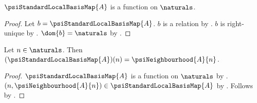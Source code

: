 \begin{proposition}\label{psi_standard_local_basis_map_type}
    $\psiStandardLocalBasisMap{A}$ is a function on $\naturals$.
\end{proposition}
\begin{proof}
    Let $b=\psiStandardLocalBasisMap{A}$.
    $b$ is a relation by
        .
    $b$ is right-unique by
        .
    $\dom{b}=\naturals$ by
        .
\end{proof}

\begin{proposition}\label{psi_standard_local_basis_map_application}
    Let $n\in\naturals$.
    Then $(\psiStandardLocalBasisMap{A})(n)=
        \psiNeighbourhood{A}{n}$.
\end{proposition}
\begin{proof}
    $\psiStandardLocalBasisMap{A}$ is a function on $\naturals$
        by .
    $(n,\psiNeighbourhood{A}{n})\in\psiStandardLocalBasisMap{A}$
        by .
    Follows by .
\end{proof}

